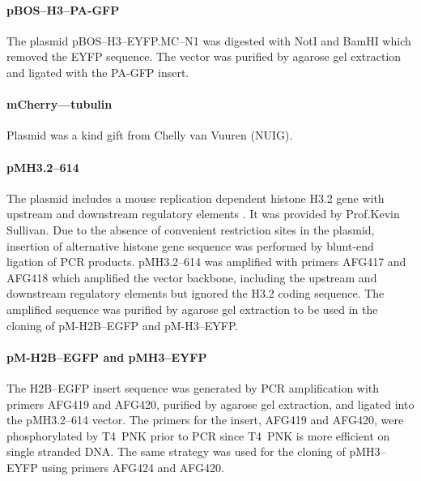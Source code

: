       \paragraph{pBOS--H3--PA-GFP}
      The plasmid pBOS--H3--EYFP.MC--N1 was digested with NotI and
      BamHI which removed the EYFP sequence.  The vector was purified
      by agarose gel extraction and ligated with the PA-GFP insert.

      \paragraph{mCherry--\textalpha--tubulin}
      Plasmid was a kind gift from Chelly van Vuuren (NUIG).

      \paragraph{pMH3.2--614}
      The plasmid includes a mouse replication dependent histone H3.2
      gene with upstream and downstream regulatory elements
      \citep{pMH3-plasmid}.  It was provided by Prof.\@ Kevin
      Sullivan.  Due to the absence of convenient restriction sites in
      the plasmid, insertion of alternative histone gene sequence was
      performed by blunt-end ligation of PCR products.  pMH3.2--614
      was amplified with primers AFG417 and AFG418 which amplified the
      vector backbone, including the upstream and downstream
      regulatory elements but ignored the H3.2 coding sequence.  The
      amplified sequence was purified by agarose gel extraction to be
      used in the cloning of pM-H2B--EGFP and pM-H3--EYFP.

      \paragraph{pM-H2B--EGFP and pMH3--EYFP}
      The H2B--EGFP insert sequence was generated by PCR amplification
      with primers AFG419 and AFG420, purified by agarose gel
      extraction, and ligated into the pMH3.2--614 vector.  The
      primers for the insert, AFG419 and AFG420, were phosphorylated
      by T4~PNK prior to PCR since T4~PNK is more efficient on single
      stranded DNA.
      The same strategy was used for the cloning of pMH3--EYFP using
      primers AFG424 and AFG420.

